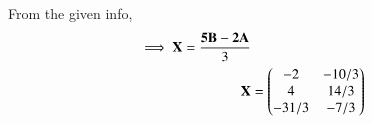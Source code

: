From the given info, 
 \begin{align}
 \implies \mathbf{X}=\frac{\mathbf{5B}-\mathbf{2A}}{3}\\
 \mathbf{X}&=\begin{pmatrix}-2 & -10/3 \\ 4 & 14/3 \\ -31/3 & -7/3\end{pmatrix}
\end{align}

